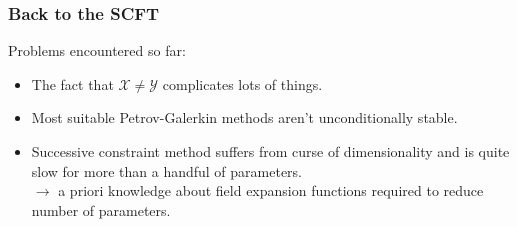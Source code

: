\begin{frame}[t]
    \frametitle{Back to the SCFT}

    Problems encountered so far:

    \begin{itemize}
        \item<1-> The fact that $\mathcal X \neq \mathcal Y$ complicates lots of things.
        \item<2-> Most suitable Petrov-Galerkin methods aren't unconditionally stable.
        \item<3-> Successive constraint method suffers from curse of dimensionality and is quite slow for more than a handful of parameters.
        \\ $\rightarrow$ a priori knowledge about field expansion functions required to reduce number of parameters.
    \end{itemize}

\end{frame}

